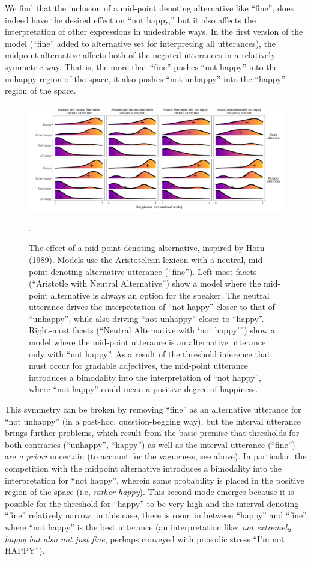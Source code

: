 \documentclass[floatsintext,doc]{apa6}
\begin{document}
We find that the inclusion of a mid-point denoting alternative like ``fine'', does indeed have
the desired effect on ``not happy,'' but it also affects the interpretation of other
expressions in undesirable ways.
In the first version of the model (``fine'' added to alternative set for interpreting all utterances), the midpoint alternative affects both of the negated utterances in a relatively symmetric way.
That is, the more that ``fine'' pushes ``not happy'' into the unhappy region of the space, it also pushes ``not unhappy'' into the ``happy'' region of the space. 

\begin{figure}[t]
\centering \includegraphics{figs/horn_SI.pdf} 
\caption{The effect of a mid-point denoting alternative, inspired by Horn (1989). Models use the Aristotelean lexicon with a neutral, mid-point denoting alternative utterance (``fine''). Left-most facets (``Aristotle with Neutral Alternative'') show a model where  the mid-point alternative is always an option for the speaker. The neutral utterance drives the interpretation of ``not happy'' closer to that of ``unhappy'', while also driving ``not unhappy'' closer to ``happy''. Right-most facets (``Neutral Alternative with `not happy''') show a model where the mid-point utterance is an alternative utterance only with ``not happy''. As a result of the threshold inference that must occur for gradable adjectives, the mid-point utterance introduces a bimodality into the interpretation of ``not happy'', where ``not happy'' could mean a positive degree of happiness.}.\label{fig:horn}
\end{figure}


This symmetry can be broken by removing ``fine'' as an alternative utterance for ``not
unhappy'' (in a post-hoc, question-begging way), but the interval utterance brings further
problems, which result from the basic premise that thresholds for both contraries (``unhappy'',
``happy'') as well as the interval utterance (``fine'') are \emph{a priori} uncertain (to account for the vagueness, see above). 
In particular, the competition with the midpoint alternative introduces a bimodality into the interpretation for ``not happy'', wherein some probability is placed in the positive region of the space (i.e, \emph{rather happy}).
This second mode emerges because it is possible for the threshold for ``happy'' to be very high and the interval denoting ``fine'' relatively narrow; in this case, there is room in between ``happy'' and ``fine'' where ``not happy'' is the best utterance (an interpretation like: \emph{not extremely happy but also not just fine}, perhaps conveyed with prosodic stress ``I'm not HAPPY''). 
\end{document}
